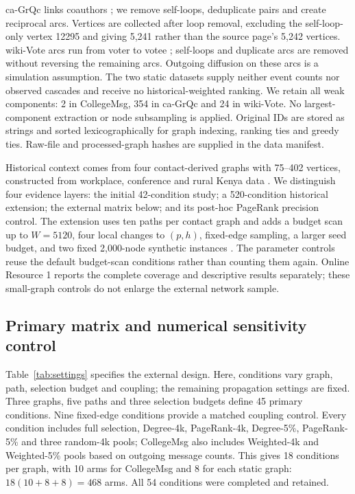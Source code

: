 \documentclass[smallextended]{svjour3}
\begin{document}
ca-GrQc links coauthors \cite{grqc}; we remove self-loops, deduplicate pairs and create reciprocal arcs. Vertices are collected after loop removal, excluding the self-loop-only vertex 12295 and giving 5,241 rather than the source page's 5,242 vertices. wiki-Vote arcs run from voter to votee \cite{signed,links}; self-loops and duplicate arcs are removed without reversing the remaining arcs. Outgoing diffusion on these arcs is a simulation assumption. The two static datasets supply neither event counts nor observed cascades and receive no historical-weighted ranking. We retain all weak components: 2 in CollegeMsg, 354 in ca-GrQc and 24 in wiki-Vote. No largest-component extraction or node subsampling is applied. Original IDs are stored as strings and sorted lexicographically for graph indexing, ranking ties and greedy ties. Raw-file and processed-graph hashes are supplied in the data manifest.

Historical context comes from four contact-derived graphs with 75--402 vertices, constructed from workplace, conference and rural Kenya data \cite{ref3,ref4,ref5,ref6}. We distinguish four evidence layers: the initial 42-condition study; a 520-condition historical extension; the external matrix below; and its post-hoc PageRank precision control. The extension uses ten paths per contact graph and adds a budget scan up to $W=5120$, four local changes to $(p,h)$, fixed-edge sampling, a larger seed budget, and two fixed 2,000-node synthetic instances \cite{ref17,ref18}. The parameter controls reuse the default budget-scan conditions rather than counting them again. Online Resource 1 reports the complete coverage and descriptive results separately; these small-graph controls do not enlarge the external network sample.

\subsection{Primary matrix and numerical sensitivity control}
Table~\ref{tab:settings} specifies the external design. Here, conditions vary graph, path, selection budget and coupling; the remaining propagation settings are fixed. Three graphs, five paths and three selection budgets define 45 primary conditions. Nine fixed-edge conditions provide a matched coupling control. Every condition includes full selection, Degree-4k, PageRank-4k, Degree-5\%, PageRank-5\% and three random-4k pools; CollegeMsg also includes Weighted-4k and Weighted-5\% pools based on outgoing message counts. This gives 18 conditions per graph, with 10 arms for CollegeMsg and 8 for each static graph: $18(10+8+8)=468$ arms. All 54 conditions were completed and retained.
\end{document}
